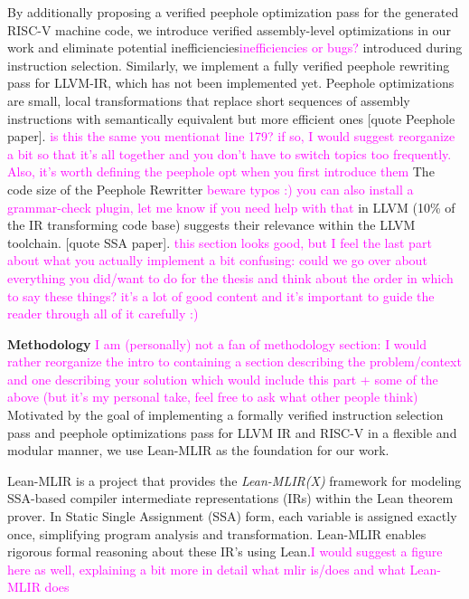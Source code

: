 By additionally proposing a verified peephole optimization pass for the generated RISC-V machine code,  we introduce verified assembly-level optimizations in our work and eliminate potential inefficiencies\textcolor{magenta}{inefficiencies or bugs?} introduced during instruction selection. Similarly, we implement a fully verified peephole rewriting pass for LLVM-IR, which has not been implemented yet. Peephole optimizations are small, local transformations that replace short sequences of assembly instructions with semantically equivalent but more efficient ones [quote Peephole paper]. \textcolor{magenta}{is this the same you mentionat line 179? if so, I would suggest reorganize a bit so that it's all together and you don't have to switch topics too frequently. Also, it's worth defining the peephole opt when you first introduce them} The code size of the Peephole Rewritter \textcolor{magenta}{beware typos :) you can also install a grammar-check plugin, let me know if you need help with that} in LLVM (10\% of the IR transforming code base) suggests their relevance within the LLVM toolchain. [quote SSA paper]. \textcolor{magenta}{this section looks good, but I feel the last part about what you actually implement a bit confusing: could we go over about everything you did/want to do for the thesis and think about the order in which to say these things? it's a lot of good content and it's important to guide the reader through all of it carefully :)}

\textbf{Methodology}
\textcolor{magenta}{I am (personally) not a fan of methodology section: I would rather reorganize the intro to containing a section describing the problem/context and one describing your solution which would include this part + some of the above (but it's my personal take, feel free to ask what other people think)}
Motivated by the goal of implementing a formally verified instruction selection pass and peephole optimizations pass for LLVM IR and RISC-V in a flexible and modular manner, we use Lean-MLIR as the foundation for our work.

Lean-MLIR is a project that provides the  \textit{Lean-MLIR(X)}  framework for modeling SSA-based compiler intermediate representations (IRs) within the Lean theorem prover. In Static Single Assignment (SSA) form, each variable is assigned exactly once, simplifying program analysis and transformation. Lean-MLIR enables rigorous formal reasoning about these IR's using Lean.\textcolor{magenta}{I would suggest a figure here as well, explaining a bit more in detail what mlir is/does 
and what Lean-MLIR does}

